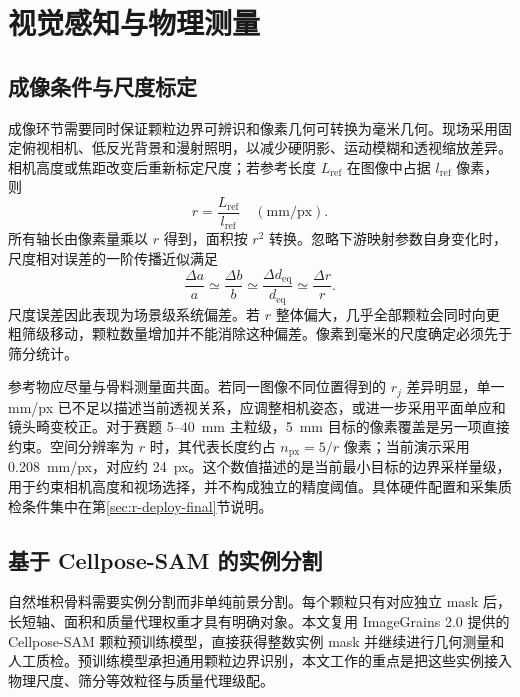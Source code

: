 \section{视觉感知与物理测量}
\label{sec:r-visual}

\subsection{成像条件与尺度标定}

成像环节需要同时保证颗粒边界可辨识和像素几何可转换为毫米几何。现场采用固定俯视相机、低反光背景和漫射照明，以减少硬阴影、运动模糊和透视缩放差异。相机高度或焦距改变后重新标定尺度；若参考长度 $L_{\mathrm{ref}}$ 在图像中占据 $l_{\mathrm{ref}}$ 像素，则
\begin{equation}
 r=\frac{L_{\mathrm{ref}}}{l_{\mathrm{ref}}}\quad (\mathrm{mm/px}).
\label{eq:r-scale}
\end{equation}
所有轴长由像素量乘以 $r$ 得到，面积按 $r^2$ 转换。忽略下游映射参数自身变化时，尺度相对误差的一阶传播近似满足
\begin{equation}
\frac{\Delta a}{a}\simeq\frac{\Delta b}{b}\simeq\frac{\Delta d_{\mathrm{eq}}}{d_{\mathrm{eq}}}\simeq\frac{\Delta r}{r}.
\label{eq:r-scale-propagation}
\end{equation}
尺度误差因此表现为场景级系统偏差。若 $r$ 整体偏大，几乎全部颗粒会同时向更粗筛级移动，颗粒数量增加并不能消除这种偏差。像素到毫米的尺度确定必须先于筛分统计。

参考物应尽量与骨料测量面共面。若同一图像不同位置得到的 $r_j$ 差异明显，单一 mm/px 已不足以描述当前透视关系，应调整相机姿态，或进一步采用平面单应和镜头畸变校正。对于赛题 5--40~mm 主粒级，5~mm 目标的像素覆盖是另一项直接约束。空间分辨率为 $r$ 时，其代表长度约占 $n_{\mathrm{px}}=5/r$ 像素；当前演示采用 0.208~mm/px，对应约 24~px。这个数值描述的是当前最小目标的边界采样量级，用于约束相机高度和视场选择，并不构成独立的精度阈值。具体硬件配置和采集质检条件集中在第\ref{sec:r-deploy-final}节说明。

\subsection{基于 Cellpose-SAM 的实例分割}

自然堆积骨料需要实例分割而非单纯前景分割。每个颗粒只有对应独立 mask 后，长短轴、面积和质量代理权重才具有明确对象。本文复用 ImageGrains 2.0 提供的 Cellpose-SAM 颗粒预训练模型\cite{mair2026imagegrains2,pachitariu2025cellposeSAM}，直接获得整数实例 mask 并继续进行几何测量和人工质检。预训练模型承担通用颗粒边界识别，本文工作的重点是把这些实例接入物理尺度、筛分等效粒径与质量代理级配。

